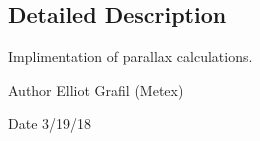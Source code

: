 \subsection{Detailed Description}
Implimentation of parallax calculations. 

\begin{DoxyAuthor}{Author}
Elliot Grafil (Metex) 
\end{DoxyAuthor}
\begin{DoxyDate}{Date}
3/19/18 
\end{DoxyDate}
